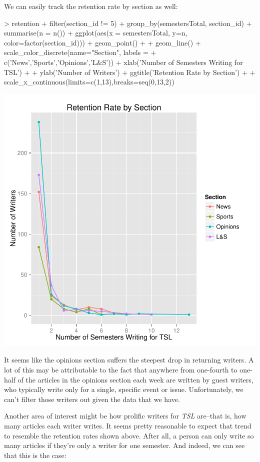 \documentclass[a4paper]{article}
\begin{document}
We can easily track the retention rate by section as well:

\begin{Schunk}
\begin{Sinput}
> retention %
+   filter(section_id != 5) %
+   group_by(semestersTotal, section_id) %
+   summarise(n = n()) %
+   ggplot(aes(x = semestersTotal, y=n, color=factor(section_id))) + geom_point() +
+   geom_line() + scale_color_discrete(name="Section", labels =
+   c('News','Sports','Opinions','L&S')) + xlab('Number of Semesters Writing for TSL') +
+   ylab('Number of Writers') + ggtitle('Retention Rate by Section') +
+   scale_x_continuous(limits=c(1,13),breaks=seq(0,13,2))
\end{Sinput}
\end{Schunk}
\includegraphics{FinalProject-016}

It seems like the opinions section suffers the steepest drop in returning writers. A lot of this may be attributable to the fact that anywhere from one-fourth to one-half of the articles in the opinions section each week are written by guest writers, who typically write only for a single, specific event or issue. Unfortunately, we can't filter those writers out given the data that we have.

Another area of interest might be how prolific writers for \textit{TSL} are--that is, how many articles each writer writes. It seems pretty reasonable to expect that trend to resemble the retention rates shown above. After all, a person can only write so many articles if they're only a writer for one semester. And indeed, we can see that this is the case:
\end{document}
